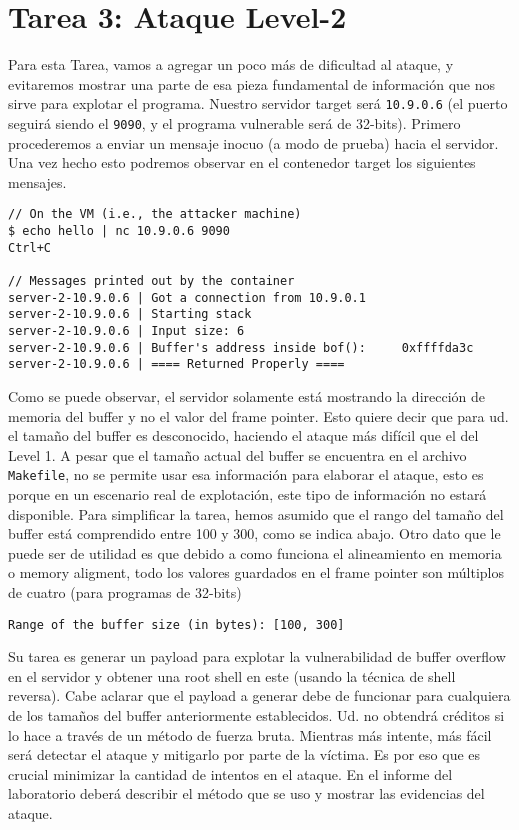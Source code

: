 \section{Tarea 3: Ataque Level-2} 

Para esta Tarea, vamos a agregar un poco más de dificultad al ataque, y evitaremos mostrar una parte de esa pieza fundamental de información que nos sirve para explotar el programa. Nuestro servidor target será \texttt{10.9.0.6} (el puerto seguirá siendo el \texttt{9090}, y el programa vulnerable será de 32-bits). 
Primero procederemos a enviar un mensaje inocuo (a modo de prueba) hacia el servidor.
Una vez hecho esto podremos observar en el contenedor target los siguientes mensajes.

\begin{lstlisting}
// On the VM (i.e., the attacker machine)
$ echo hello | nc 10.9.0.6 9090
Ctrl+C

// Messages printed out by the container
server-2-10.9.0.6 | Got a connection from 10.9.0.1
server-2-10.9.0.6 | Starting stack
server-2-10.9.0.6 | Input size: 6
server-2-10.9.0.6 | Buffer's address inside bof():     0xffffda3c
server-2-10.9.0.6 | ==== Returned Properly ====
\end{lstlisting}

Como se puede observar, el servidor solamente está mostrando la dirección de memoria del buffer y no el valor del frame pointer. Esto quiere decir que para ud. el tamaño del buffer es desconocido, haciendo el ataque más difícil que el del Level 1.
A pesar que el tamaño actual del buffer se encuentra en el archivo \texttt{Makefile}, no se permite usar esa información para elaborar el ataque, esto es porque en un escenario real de explotación, este tipo de información no estará disponible.
Para simplificar la tarea, hemos asumido que el rango del tamaño del buffer está comprendido entre 100 y 300, como se indica abajo.
Otro dato que le puede ser de utilidad es que debido a como funciona el alineamiento en memoria o memory aligment, todo los valores guardados en el frame pointer son múltiplos de cuatro (para programas de 32-bits)


\begin{lstlisting}
Range of the buffer size (in bytes): [100, 300]
\end{lstlisting}
 
Su tarea es generar un payload para explotar la vulnerabilidad de buffer overflow en el servidor y obtener una root shell en este (usando la técnica de shell reversa). Cabe aclarar que el payload a generar debe de funcionar para cualquiera de los tamaños del buffer anteriormente establecidos. Ud. no obtendrá créditos si lo hace a través de un método de fuerza bruta. Mientras más intente, más fácil será detectar el ataque y mitigarlo por parte de la víctima. Es por eso que es crucial minimizar la cantidad de intentos en el ataque.
En el informe del laboratorio deberá describir el método que se uso y mostrar las evidencias del ataque.


